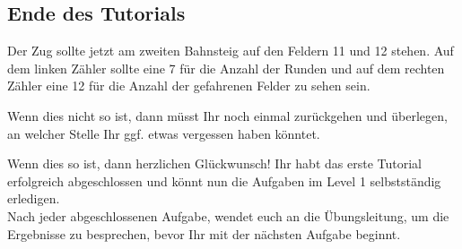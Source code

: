 \subsection*{Ende des Tutorials}
  Der Zug sollte jetzt am zweiten Bahnsteig auf den Feldern 11 und 12 stehen. Auf dem linken Zähler sollte eine 7 für die Anzahl der Runden und auf dem rechten Zähler eine 12 für die Anzahl der gefahrenen Felder zu sehen sein.
  \begin{framed}\noindent
    Wenn dies nicht so ist, dann müsst Ihr noch einmal zurückgehen und überlegen, an welcher Stelle Ihr ggf. etwas vergessen haben könntet.
  \end{framed}
  \begin{framed}\noindent
    Wenn dies so ist, dann herzlichen Glückwunsch! Ihr habt das erste Tutorial erfolgreich abgeschlossen und könnt nun die Aufgaben im Level 1 selbstständig erledigen. \\
    Nach jeder abgeschlossenen Aufgabe, wendet euch an die Übungsleitung, um die Ergebnisse zu besprechen, bevor Ihr mit der nächsten Aufgabe beginnt. 
  \end{framed}
